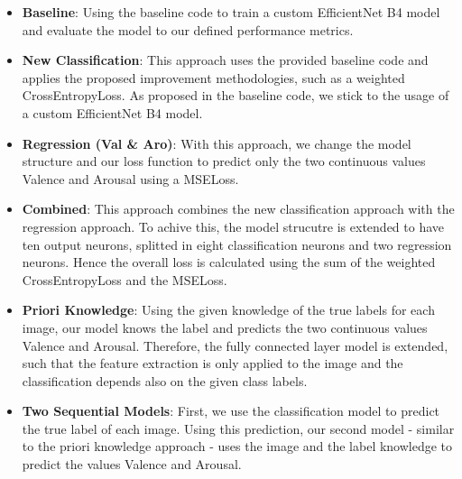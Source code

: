 \documentclass[conference]{IEEEtran}
\begin{document}
\begin{itemize}
    \item \textbf{Baseline}: Using the baseline code to train a custom EfficientNet B4 model and evaluate the model to  our defined performance metrics. 
    \item \textbf{New Classification}: This approach uses the provided baseline code and applies the proposed improvement methodologies, such as a weighted CrossEntropyLoss. As proposed in the baseline code, we stick to the usage of a custom EfficientNet B4 model. 
    \item \textbf{Regression (Val \& Aro)}: With this approach, we change the model structure and our loss function to predict only the two continuous values Valence and Arousal using a MSELoss.
\item \textbf{Combined}: This approach combines the new classification approach with the regression approach. To achive this, the model strucutre is extended to have ten output neurons, splitted in eight classification neurons and two regression neurons. Hence the overall loss is calculated using the sum of the weighted CrossEntropyLoss and the MSELoss.
\item \textbf{Priori Knowledge}: Using the given knowledge of the true labels for each image, our model knows the label and predicts the two continuous values Valence and Arousal. Therefore, the fully connected layer model is extended, such that the feature extraction is only applied to the image and the classification depends also on the given class labels.
\item \textbf{Two Sequential Models}: First, we use the classification model to predict the true label of each image. Using this prediction, our second model - similar to the priori knowledge approach - uses the image and the label knowledge to predict the values Valence and Arousal.
\end{itemize}





\newpage

\begin{table}[htbp]
\centering
{}
\caption{Performance Metrics Comparison for Various Approaches}
\label{tab:metrics}
\end{table}
\end{document}
